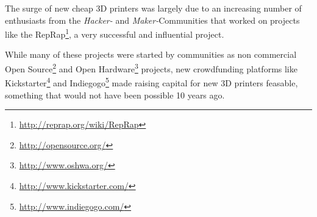 
The surge of new cheap 3D printers was largely due to an increasing number of
enthusiasts from the \emph{Hacker-} and \emph{Maker-}Communities that worked on
projects like the RepRap\footnote{\url{http://reprap.org/wiki/RepRap}}, a very
successful and influential project.

While many of these projects were started by communities as non commercial Open
Source\footnote{\url{http://opensource.org/}} and Open
Hardware\footnote{\url{http://www.oshwa.org/}} projects, new crowdfunding
platforms like Kickstarter\footnote{\url{http://www.kickstarter.com/}} and
Indiegogo\footnote{\url{http://www.indiegogo.com/}} made raising capital for new
3D printers feasable, something that would not have been possible 10 years ago.
